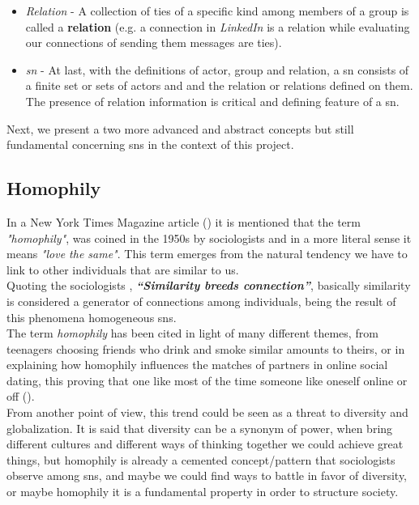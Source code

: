 \begin{itemize}
    \item \emph{Relation} - A collection of ties of a specific kind among members of a group is called a \textbf{relation} (e.g. a connection in \textit{LinkedIn} is a relation while evaluating our connections of sending them messages are ties).
    \item \emph{\gls{sn}} - At last, with the definitions of actor, group and relation, a \gls{sn} consists of a finite set or sets of actors and
    and the relation or relations defined on them. The presence of relation information is critical and defining feature of a \gls{sn}.
\end{itemize}

Next, we present a two more advanced and abstract concepts but still fundamental concerning \glspl{sn} in the context of this project.

\subsection*{Homophily}

In a New York Times Magazine article (\cite{nytmagazinehomop}) it is mentioned that the term \textit{"homophily"}, was coined in the 1950s by sociologists and in a more literal sense it means \textit{"love the same"}. This term emerges from the natural tendency we have to link to other individuals that are similar to us.\\
\indent Quoting the sociologists \cite{mcpherson2001birds}, \textbf{\textit{“Similarity breeds connection”}}, basically similarity is considered a generator of connections among individuals, being the result of this phenomena homogeneous \glspl{sn}.\\
\indent The term \textit{homophily} has been cited in light of many different themes, from teenagers choosing friends who drink and smoke similar amounts to theirs, or in explaining how homophily influences the matches of partners in online social dating, this proving that one like most of the time someone like oneself online or off (\cite{fiore2005homophily}).\\
\indent From another point of view, this trend could be seen as a threat to diversity and globalization. It is said that diversity can be a synonym of power, when bring different cultures and different ways of thinking together we could achieve great things, but homophily is already a cemented concept/pattern that sociologists observe among \glspl{sn}, and maybe we could find ways to battle in favor of diversity, or maybe homophily it is a fundamental property in order to structure society.

